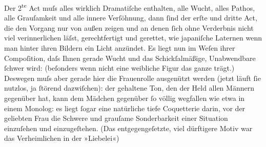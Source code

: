 \pstart
           {\pb}Der 2\textsuperscript{te}{ }Act muſs alles wirklich
               Dramatiſche enthalten, alle Wucht, alles Pathos, alle Grauſamkeit und alle innere Verſöhnung, dann ſind der erſte und dritte
               Act, die den Vorgang nur von außen zeigen und an denen ſich ohne Verderbnis nicht
               viel verinnerlichen läſst, gerechtfertigt und gerettet, wie japaniſche Laternen wenn man hinter ihren Bildern ein Licht
               anzündet. Es liegt {\pb}nun im Weſen
               ihrer Compoſition, daſs Ihnen gerade Wucht und das Schickſalmäßige, Unabwendbare
               ſchwer wird: (beſonders wenn nicht eine weibliche Figur das ganze trägt.) Deswegen
               muſs aber gerade hier die Frauenrolle ausgenützt werden (jetzt läuft ſie nutzlos, ja
               ſtörend dazwiſchen): der gehaltene Ton, den der Held allen Männern gegenüber hat,
               kann dem Mädchen gegenüber ſo völlig wegfallen wie etwa in einem Monolog: es liegt
               ſogar eine natürliche tiefe Coquetterie darin, {\pb}vor der geliebten Frau die Schwere
               und grauſame Sonderbarkeit einer Situation einzuſehen und einzugeſtehen. (Das
               entgegengeſetzte, viel dürftigere Motiv war das Verheimlichen in der »Liebelei«)\pend
           
